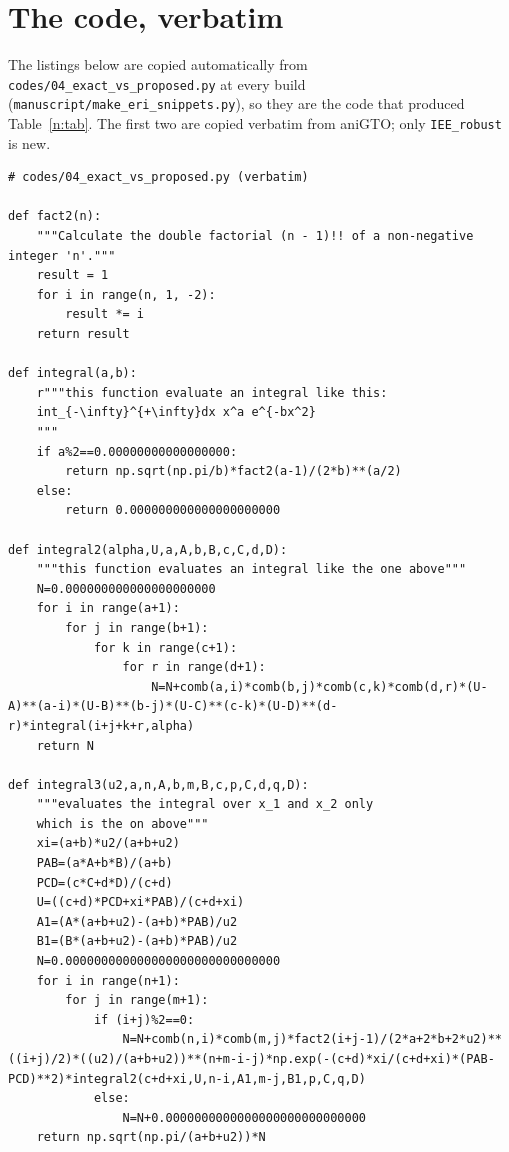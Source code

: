 \documentclass[11pt]{article}
\begin{document}
\section{The code, verbatim}
\label{n:sec:listings}
The listings below are copied automatically from \texttt{codes/04\_exact\_vs\_proposed.py} at every build
(\texttt{manuscript/make\_eri\_snippets.py}), so they are the code that produced Table~\ref{n:tab}.  The
first two are copied verbatim from aniGTO; only \texttt{IEE\_robust} is new.

\begin{lstlisting}[caption={aniGTO kernel: Gaussian moments (eq~\ref{n:moment}), products of four monomials
  (eq~\ref{n:int2}) and the closed-form $I_k(u^2)$ (eqs~\ref{n:x1}--\ref{n:Ik-closed}).},label=n:code:kernel]
# codes/04_exact_vs_proposed.py (verbatim)

def fact2(n):
    """Calculate the double factorial (n - 1)!! of a non-negative integer 'n'."""
    result = 1
    for i in range(n, 1, -2):
        result *= i
    return result

def integral(a,b):
    r"""this function evaluate an integral like this:
    int_{-\infty}^{+\infty}dx x^a e^{-bx^2}
    """
    if a%2==0.00000000000000000:
        return np.sqrt(np.pi/b)*fact2(a-1)/(2*b)**(a/2)
    else:
        return 0.000000000000000000000

def integral2(alpha,U,a,A,b,B,c,C,d,D):
    """this function evaluates an integral like the one above"""
    N=0.000000000000000000000
    for i in range(a+1):
        for j in range(b+1):
            for k in range(c+1):
                for r in range(d+1):
                    N=N+comb(a,i)*comb(b,j)*comb(c,k)*comb(d,r)*(U-A)**(a-i)*(U-B)**(b-j)*(U-C)**(c-k)*(U-D)**(d-r)*integral(i+j+k+r,alpha)
    return N

def integral3(u2,a,n,A,b,m,B,c,p,C,d,q,D):
    """evaluates the integral over x_1 and x_2 only
    which is the on above"""
    xi=(a+b)*u2/(a+b+u2)
    PAB=(a*A+b*B)/(a+b)
    PCD=(c*C+d*D)/(c+d)
    U=((c+d)*PCD+xi*PAB)/(c+d+xi)
    A1=(A*(a+b+u2)-(a+b)*PAB)/u2
    B1=(B*(a+b+u2)-(a+b)*PAB)/u2
    N=0.000000000000000000000000000000
    for i in range(n+1):
        for j in range(m+1):
            if (i+j)%2==0:
                N=N+comb(n,i)*comb(m,j)*fact2(i+j-1)/(2*a+2*b+2*u2)**((i+j)/2)*((u2)/(a+b+u2))**(n+m-i-j)*np.exp(-(c+d)*xi/(c+d+xi)*(PAB-PCD)**2)*integral2(c+d+xi,U,n-i,A1,m-j,B1,p,C,q,D)
            else:
                N=N+0.0000000000000000000000000000
    return np.sqrt(np.pi/(a+b+u2))*N
\end{lstlisting}
\end{document}
